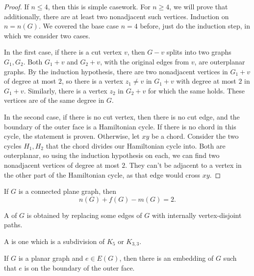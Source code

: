 \begin{proof}
  If $n \le 4$, then this is simple casework.
  For $n \ge 4$, we will prove that additionally, there are at least two
  nonadjacent such vertices.
  Induction on $n = n(G)$.
  We covered the base case $n=4$ before, just do the induction step, in which we
  consider two cases.

  In the first case, if there is a cut vertex $v$, then $G-v$ splits into two
  graphs $G_1, G_2$.
  Both $G_1 + v$ and $G_2 + v$, with the original edges from $v$, are
  outerplanar graphs.
  By the induction hypothesis, there are two nonadjacent vertices in $G_1 + v$
  of degree at most $2$, so there is a vertex $z_1 \ne v$ in $G_1 + v$ with
  degree at most $2$ in $G_1 + v$.
  Similarly, there is a vertex $z_2$ in $G_2 + v$ for which the same holds.
  These vertices are of the same degree in $G$.

  In the second case, if there is no cut vertex, then there is no cut edge, and
  the boundary of the outer face is a Hamiltonian cycle.
  If there is no chord in this cycle, the statement is proven.
  Otherwise, let $xy$ be a chord.
  Consider the two cycles $H_1, H_2$ that the chord divides our Hamiltonian
  cycle into.
  Both are outerplanar, so using the induction hypothesis on each, we can find
  two nonadjacent vertices of degree at most $2$.
  They can't be adjacent to a vertex in the other part of the Hamiltonian cycle,
  as that edge would cross $xy$.
\end{proof}


\begin{theorem}[Euler]
  If $G$ is a connected plane graph, then
  \[
	n(G) + f(G) - m(G) = 2.
  \]
\end{theorem}

\begin{definition}
  A  of $G$ is obtained by replacing some edges of $G$ with
  internally vertex-disjoint paths.
\end{definition}

\begin{definition}
  A  is one which is a subdivision of $K_5$ or
  $K_{3,3}$.
\end{definition}

\begin{lemma}
  \label{lemma:tg-kuratowski-1}
  If $G$ is a planar graph and $e \in E(G)$, then there is an embedding of $G$
  such that $e$ is on the boundary of the outer face.
\end{lemma}

